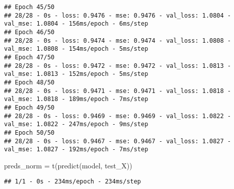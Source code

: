 \documentclass[
]{article}
\newenvironment{Shaded}{\begin{snugshade}}{\end{snugshade}}
\newcommand{\AttributeTok}[1]{\textcolor[rgb]{0.77,0.63,0.00}{#1}}
\newcommand{\CommentTok}[1]{\textcolor[rgb]{0.56,0.35,0.01}{\textit{#1}}}
\newcommand{\DecValTok}[1]{\textcolor[rgb]{0.00,0.00,0.81}{#1}}
\newcommand{\FunctionTok}[1]{\textcolor[rgb]{0.00,0.00,0.00}{#1}}
\newcommand{\NormalTok}[1]{#1}
\newcommand{\OtherTok}[1]{\textcolor[rgb]{0.56,0.35,0.01}{#1}}
\newcommand{\SpecialCharTok}[1]{\textcolor[rgb]{0.00,0.00,0.00}{#1}}
\begin{document}
\begin{verbatim}
## Epoch 45/50
## 28/28 - 0s - loss: 0.9476 - mse: 0.9476 - val_loss: 1.0804 - val_mse: 1.0804 - 156ms/epoch - 6ms/step
## Epoch 46/50
## 28/28 - 0s - loss: 0.9474 - mse: 0.9474 - val_loss: 1.0808 - val_mse: 1.0808 - 154ms/epoch - 5ms/step
## Epoch 47/50
## 28/28 - 0s - loss: 0.9472 - mse: 0.9472 - val_loss: 1.0813 - val_mse: 1.0813 - 152ms/epoch - 5ms/step
## Epoch 48/50
## 28/28 - 0s - loss: 0.9471 - mse: 0.9471 - val_loss: 1.0818 - val_mse: 1.0818 - 189ms/epoch - 7ms/step
## Epoch 49/50
## 28/28 - 0s - loss: 0.9469 - mse: 0.9469 - val_loss: 1.0822 - val_mse: 1.0822 - 247ms/epoch - 9ms/step
## Epoch 50/50
## 28/28 - 0s - loss: 0.9467 - mse: 0.9467 - val_loss: 1.0827 - val_mse: 1.0827 - 192ms/epoch - 7ms/step
\end{verbatim}

\begin{Shaded}
\begin{Highlighting}[]
\NormalTok{preds\_norm }\OtherTok{=} \FunctionTok{t}\NormalTok{(}\FunctionTok{predict}\NormalTok{(model, test\_X))}
\end{Highlighting}
\end{Shaded}

\begin{verbatim}
## 1/1 - 0s - 234ms/epoch - 234ms/step
\end{verbatim}

\begin{Shaded}
\end{Shaded}
\end{document}
